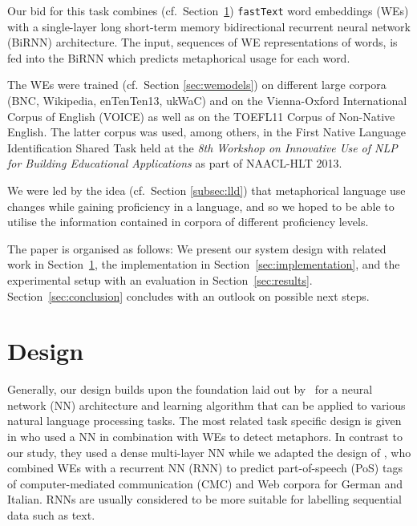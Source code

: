 \documentclass[11pt,a4paper]{article}
\newcommand\fT{\texttt{fastText}\xspace}
\begin{document}
Our bid for this task combines (cf.~Section~\ref{sec:design}) \fT word embeddings (WEs) with a single-layer long short-term memory bidirectional recurrent neural network (BiRNN) architecture.
The input, sequences of WE representations of words, is fed into the BiRNN which predicts metaphorical usage for each word. 

The WEs were trained (cf.~Section \ref{sec:wemodels}) on different large corpora (BNC, Wikipedia, enTenTen13, ukWaC) and on the Vienna-Oxford International Corpus of English (VOICE) as well as on the TOEFL11 Corpus of Non-Native English. The latter corpus was used, among others, in the First Native Language Identification Shared Task \cite{tetreault-blanchard-cahill:2013:BEA} held at the \emph{8th Workshop on Innovative Use of NLP for Building Educational Applications} as part of NAACL-HLT 2013.

We were led by the idea (cf.~Section \ref{subsec:lld}) that metaphorical language use changes while gaining proficiency in a language, and so we hoped to be able to utilise the information contained in corpora of different proficiency levels.

The paper is organised as follows: We present our system design with related work in
Section~\ref{sec:design}, the implementation in
Section~\ref{sec:implementation}, and the experimental setup with an evaluation in
Section~\ref{sec:results}. 
Section~\ref{sec:conclusion} concludes with an outlook on possible next steps.



\section{Design} %
\label{sec:design}

Generally, our design builds upon the foundation laid out by~ for a neural network (NN) architecture and learning algorithm that can be applied to various natural language processing tasks.
The most related task specific design is given in  who used a NN in combination with WEs to detect metaphors. 
In contrast to our study, they used a dense multi-layer NN while we adapted the design of , who combined WEs with a recurrent NN (RNN) to predict part-of-speech (PoS) tags of computer-mediated communication (CMC) and Web corpora for German and Italian.
RNNs are usually considered to be more suitable for labelling sequential data such as text.
\end{document}

